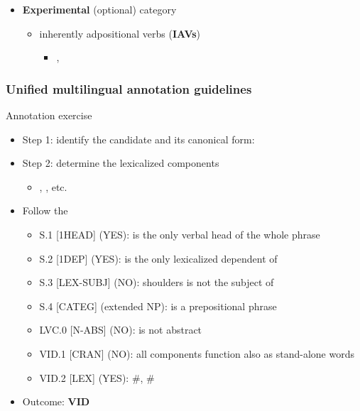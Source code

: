 \documentclass[xcolor=dvipsnames]{beamer}
\begin{document}
\begin{frame}
\begin{scriptsize}
\begin{block}{}
\begin{itemize}
\item \textbf{Experimental} (optional) category
   \begin{itemize}
   \item inherently adpositional verbs (\textbf{IAVs})
	\begin{itemize}
	\item[]  , 
	\end{itemize}	
   \end{itemize}
\end{itemize}
\end{block}
\end{scriptsize}

\end{frame}

\begin{frame} 
\frametitle{Unified multilingual annotation guidelines \href{http://parsemefr.lif.univ-mrs.fr/parseme-st-guidelines/1.1}{\beamergotobutton{[link]}}}


\begin{scriptsize}
\begin{block}{Annotation exercise}
\begin{itemize}
\item Step 1: identify the candidate and its canonical form: 
\item Step 2: determine the lexicalized components
   \begin{itemize}
   \item {}, , etc.
   \end{itemize}
\item Follow the \href{http://parsemefr.lif.univ-mrs.fr/parseme-st-guidelines/1.1/?page=040\_Annotation\_process\_-\_decision\_tree}{}
   \begin{itemize}
   \item S.1 [1HEAD] (YES):  is the only verbal head of the whole phrase
   \item S.2 [1DEP] (YES):  is the only lexicalized dependent of 
   \item S.3 [LEX-SUBJ] (NO):  shoulders is not the subject of 
   \item S.4 [CATEG] (extended NP):  is a prepositional phrase
   \item LVC.0 [N-ABS] (NO):  is not abstract
   \item VID.1 [CRAN] (NO): all components function also as stand-alone words
   \item VID.2 [LEX] (YES): \#, \#
   \end{itemize}
\item Outcome: \textbf{VID}
\end{itemize}
\end{block}


\end{scriptsize}
\end{frame}
\end{document}
